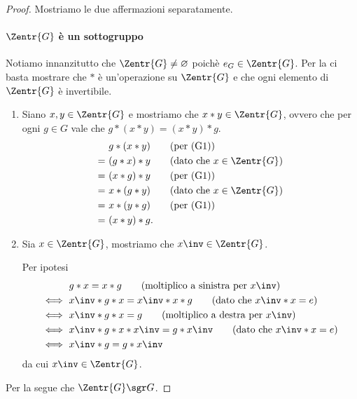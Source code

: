 \begin{proof} Mostriamo le due affermazioni separatamente.
    \paragraph{$\Zentr{G}$ è un sottogruppo} 
    Notiamo innanzitutto che $\Zentr{G} \neq \varnothing$ poichè $e_G \in \Zentr{G}$. Per la  ci basta mostrare che $*$ è un'operazione su $\Zentr{G}$ e che ogni elemento di $\Zentr{G}$ è invertibile.
    \begin{enumerate}
        [label={(\arabic*)}]
        \item Siano $x, y \in \Zentr{G}$ e mostriamo che $x*y \in \Zentr{G}$, ovvero che per ogni $g \in G$ vale che $g*(x\ast y) = (x\ast y)\ast g$. 
        \begin{align*}
            &g\ast (x\ast y) \tag*{(per (G1))}\\
            =\ &(g\ast x)\ast y \tag*{(dato che $x \in \Zentr{G}$)}\\
            =\ &(x\ast g)\ast y \tag*{(per (G1))}\\
            =\ &x\ast (g\ast y) \tag*{(dato che $x \in \Zentr{G}$)} \\
            =\ &x\ast (y\ast g) \tag*{(per (G1))}\\
            =\ &(x\ast y)\ast g.
        \end{align*}
        \item Sia $x \in \Zentr{G}$, mostriamo che $x\inv \in \Zentr{G}$.
        
        Per ipotesi \begin{align*}
            &g\ast x = x\ast g \tag*{(moltiplico a sinistra per $x\inv$)} \\
            \iff\ &x\inv \ast  g\ast x = x\inv \ast  x\ast g\tag*{(dato che $x\inv \ast  x = e$)} \\
            \iff\ &x\inv \ast  g\ast x = g \tag*{(moltiplico a destra per $x\inv$)} \\
            \iff\ &x\inv \ast  g\ast x\ast x\inv = g\ast x\inv \tag*{(dato che $x\inv \ast  x = e$)} \\
            \iff\ &x\inv \ast  g = g\ast x\inv
        \end{align*}
        da cui $x\inv \in \Zentr{G}$.
    \end{enumerate}

    Per la  segue che $\Zentr{G} \sgr G$.


\end{proof}
